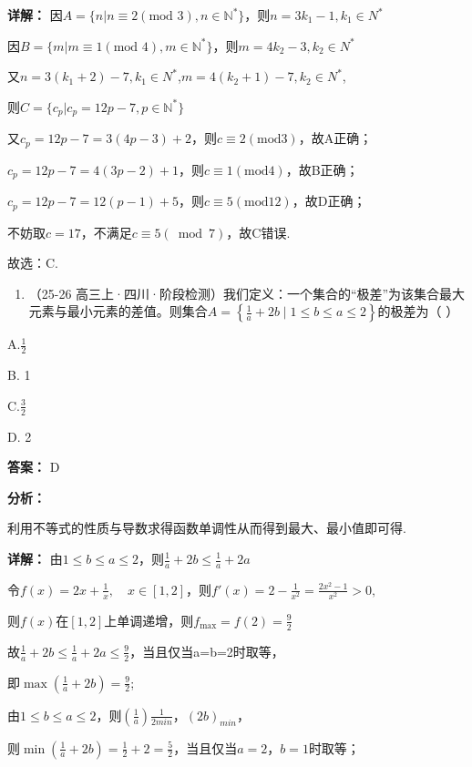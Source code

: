\documentclass[11pt,a4paper]{ctexart}
\begin{document}
\textbf{详解：}
因\(A=\{n|n\equiv2(\text{mod }3),n\in \mathbb{N}^{*}\}\)，则\(n=3k_{1}-1,k_{1}\in N^{*}\)

因\(B=\{m|m\equiv1(\text{mod }4),m\in \mathbb{N}^{*}\}\)，则\(m=4k_{2}-3,k_{2}\in N^{*}\)

又\(n = 3(k_{1} + 2) - 7, k_{1} \in N^{*}\),\(m = 4(k_{2} + 1) - 7, k_{2} \in N^{*}\),

则\(C = \{c_p | c_p = 12p - 7, p \in \mathbb{N}^*\}\)

又\(c_{p}=12p-7=3(4p-3)+2\)，则\(c\equiv2(\text{mod}3)\)，故A正确；

\(c_{p} = 12p - 7 = 4(3p - 2) + 1\)，则\(c\equiv 1(\mathrm{mod}4)\)，故B正确；

\(c_{p} = 12p - 7 = 12(p - 1) + 5\)，则\(c\equiv 5(\mathrm{mod}12)\)，故D正确；

不妨取\(c=17\)，不满足\(c\equiv5(\bmod7)\)，故C错误.

故选：C.

\begin{enumerate}[label=\arabic*., leftmargin=*, start=3]
\item （25-26
  高三上·四川·阶段检测）我们定义：一个集合的``极差''为该集合最大元素与最小元素的差值。则集合\(A = \left\{\frac{1}{a} + 2b \mid 1 \leq b \leq a \leq 2\right\}\)的极差为（
  ）
\end{enumerate}

A.\(\frac{1}{2}\)

B. 1

C.\(\frac{3}{2}\)

D. 2

\textbf{答案：}
D

\textbf{分析：}

利用不等式的性质与导数求得函数单调性从而得到最大、最小值即可得.

\textbf{详解：}
由\(1 \leq b \leq a \leq 2\)，则\(\frac{1}{a} + 2b \leq \frac{1}{a} + 2a\)

令\(f(x)=2x+\frac{1}{x},\quad x\in[1,2]\)，则\(f'(x)=2-\frac{1}{x^{2}}=\frac{2x^{2}-1}{x^{2}}>0,\)

则\(f(x)\)在\([1,2]\)上单调递增，则\(f_{\max}=f(2)=\frac92\)

故\(\frac{1}{a}+2b\leq\frac{1}{a}+2a\leq\frac{9}{2}\)，当且仅当a=b=2时取等，

即\(\max\left(\frac1a+2b\right)=\frac92\);

由\(1 \leq b \leq a \leq 2\)，则\(\left(\frac{1}{a}\right)\frac{1}{2min}\)，\((2b)_{min}\)，

则\(\min\left(\frac1a+2b\right)=\frac12+2=\frac52\)，当且仅当\(a = 2\)，\(b = 1\)时取等；
\end{document}
